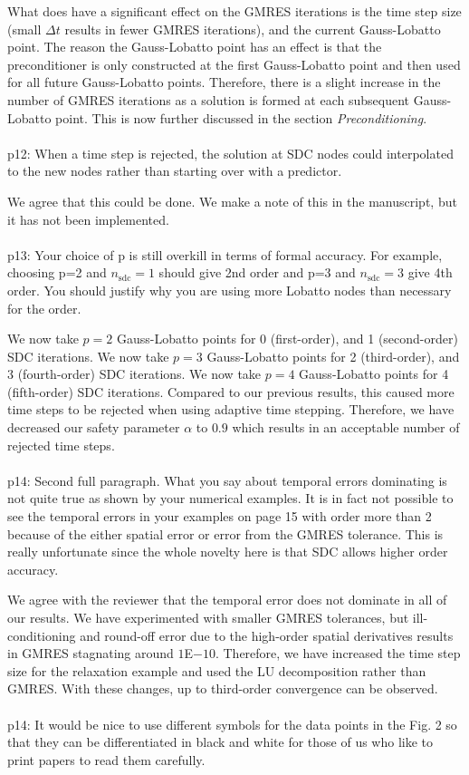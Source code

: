 \documentclass[12pt]{article}
\newcommand{\comment}[1]{{\color{blue} #1}}
\newcommand{\sdc}{{\mathrm{sdc}}}
\begin{document}
What does have a significant effect on the GMRES iterations is the time
step size (small $\Delta t$ results in fewer GMRES iterations), and the
current Gauss-Lobatto point.  The reason the Gauss-Lobatto point has an
effect is that the preconditioner is only constructed at the first
Gauss-Lobatto point and then used for all future Gauss-Lobatto points.
Therefore, there is a slight increase in the number of GMRES iterations
as a solution is formed at each subsequent Gauss-Lobatto point.  This
is now further discussed in the section {\em Preconditioning}.  \\ \\
\comment{p12: When a time step is rejected,  the solution at SDC nodes could
interpolated to the new nodes rather than starting over with a
predictor.}

We agree that this could be done.  We make a note of this in the
manuscript, but it has not been implemented. \\ \\
\comment{p13: Your choice of p is still overkill in terms of formal
accuracy.  For example, choosing p=2 and $n_{\sdc}=1$ should give 2nd
order and p=3 and $n_{\sdc}=3$ give 4th order.  You should justify why
you are using more Lobatto nodes than necessary for the order.}

We now take $p=2$ Gauss-Lobatto points for 0 (first-order), and 1
(second-order) SDC iterations.  We now take $p=3$ Gauss-Lobatto points
for 2 (third-order), and 3 (fourth-order) SDC iterations.  We now take
$p=4$ Gauss-Lobatto points for 4 (fifth-order) SDC iterations.  Compared
to our previous results, this caused more time steps to be rejected when
using adaptive time stepping.  Therefore, we have decreased our safety
parameter $\alpha$ to $0.9$ which results in an acceptable number of
rejected time steps.\\ \\
\comment{p14: Second full paragraph.  What you say about temporal errors
dominating is not quite true as shown by your numerical examples.  It is
in fact not possible to see the temporal errors in your examples on page
15 with order more than 2 because of the either spatial error or error
from the GMRES tolerance.  This is really unfortunate since the whole
novelty here is that SDC allows higher order accuracy.}

We agree with the reviewer that the temporal error does not dominate in
all of our results.  We have experimented with smaller GMRES tolerances,
but ill-conditioning and round-off error due to the high-order spatial
derivatives results in GMRES stagnating around $1$E$-10$.  Therefore, we
have increased the time step size for the relaxation example and used
the LU decomposition rather than GMRES.  With these changes, up to
third-order convergence can be observed. \\ \\
\comment{p14: It would be nice to use different symbols for the data
points in the Fig. 2 so that they can be differentiated in black and
white for those of us who like to print papers to read them carefully.
}
\end{document}

